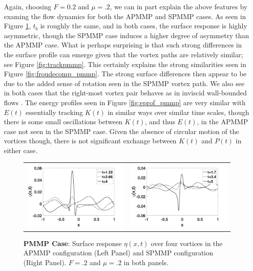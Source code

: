 \documentclass[a4paper,11pt]{article}
\begin{document}
Again, choosing $F=0.2$ and $\mu=.2$, we can in part explain the above features by examing the flow dynamics for both the APMMP and SPMMP cases.  As seen in Figure \ref{fig:surfreppmmp}, $t_{b}$ is roughly the same, and in both cases, the surface response is highly asymmetric, though the SPMMP case induces a higher degree of asymmetry than the APMMP case.  What is perhaps surprising is that such strong differences in the surface profile can emerge given that the vortex paths are relatively similar; see Figure \ref{fig:trackpmmp}.  This certainly explains the strong similarities seen in Figure \ref{fig:froudecomp_pmmp}.  The strong surface differences then appear to be due to the added sense of rotation seen in the SPMMP vortex path.  We also see in both cases that the right-most vortex pair behaves as in inviscid wall-bounded flows \cite{lamb}.  The energy profiles seen in Figure \ref{fig:eprof_pmmp}     are very similar with $E(t)$ essentially tracking $K(t)$ in similar ways over similar time scales, though there is some small oscillations between $K(t)$, and thus $E(t)$, in the APMMP case not seen in the SPMMP case. Given the absence of circular motion of the vortices though, there is not significant exchange between $K(t)$ and $P(t)$ in either case.   
\begin{figure}[!h]
\centering
\begin{tabular}{cc}
\includegraphics[width=.5\textwidth]{surf_resp_mu_pt2_F_pt2_pmmp} & 
\includegraphics[width=.5\textwidth]{surf_resp_mu_pt2_F_pt2_pmmp_sym}
\end{tabular}
\caption{\small {\bf PMMP Case}: Surface response $\eta(x,t)$ over four vortices in the APMMP configuration (Left Panel) and SPMMP configuration (Right Panel).  $F=.2$ and $\mu=.2$ in both panels.}
\label{fig:surfreppmmp}
\end{figure}
\end{document}
